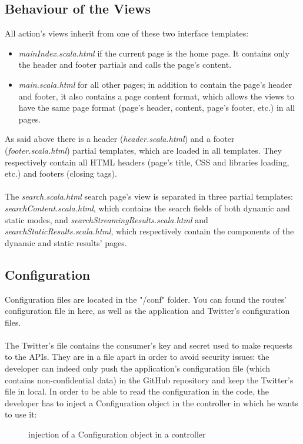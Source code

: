 \documentclass[a4paper,11pt]{report}
\begin{document}
\subsection{Behaviour of the Views}
All action's views inherit from one of these two interface templates: 
\begin{itemize}
	\item \emph{mainIndex.scala.html} if the current page is the home page. It contains only the header and footer partials and calls the page's content.
	 \item \emph{main.scala.html} for all other pages; in addition to contain the page's header and footer, it also contains a page content format, which allows the views to have the same page format (page's header, content, page's footer, etc.) in all pages.
\end{itemize}
As said above there is a header (\emph{header.scala.html}) and a footer (\emph{footer.scala.html}) partial templates, which are loaded in all templates. They respectively contain all HTML headers (page's title, CSS and libraries loading, etc.) and footers (closing tags).\\\\
The \emph{search.scala.html} search page's view is separated in three partial templates: \emph{searchContent.scala.html}, which contains the search fields of both dynamic and static modes, and \emph{searchStreamingResults.scala.html} and \emph{searchStaticResults.scala.html}, which respectively contain the components of the dynamic and static results' pages.

\subsection{Configuration}
Configuration files are located in the "/conf" folder. You can found the routes' configuration file in here, as well as the application and Twitter's configuration files.\\\\
The Twitter's file contains the consumer's key and secret used to make requests to the APIs. They are in a file apart in order to avoid security issues: the developer can indeed only push the application's configuration file (which contains non-confidential data) in the GitHub repository and keep the Twitter's file in local.
\newpage
In order to be able to read the configuration in the code, the developer has to inject a Configuration object in the controller in which he wants to use it:
\begin{figure}[H]
\vspace{-5pt}
\begin{center}
\vspace{-20pt}
\caption{injection of a Configuration object in a controller}
\end{center}
\end{figure}
\end{document}
